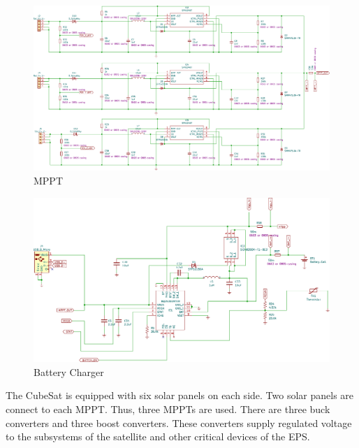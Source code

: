   \begin{figure}[h]
 	\centering
 	\includegraphics[width=0.99\columnwidth]{FrontMatter/pcb-MPPTv2.pdf}
 	\caption{\centering MPPT}
 	\label{fig:mpp 4lr}
 \end{figure}
 
   \begin{figure}[H]
 	\centering
 	\includegraphics[width=0.99\columnwidth]{FrontMatter/pcb-Battery Charger.pdf}
 	\caption{\centering Battery Charger}
 	\label{fig:batt 4lr}
 \end{figure}


 
The CubeSat is equipped with six solar panels on each side. Two solar panels are connect to each MPPT. Thus, three MPPTs are used.
There are three buck converters and three boost converters. These converters supply regulated voltage to the subsystems of the satellite and other critical devices of the EPS.

